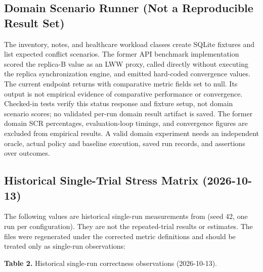 \documentclass[runningheads]{llncs}
\begin{document}
\subsection{Domain Scenario Runner (Not a Reproducible Result Set)}
The inventory, notes, and healthcare workload classes create SQLite fixtures and list expected conflict scenarios. The former API benchmark implementation scored the replica-B value as an LWW proxy, called \texttt{} directly without executing the replica synchronization engine, and emitted hard-coded convergence values. The current \texttt{} endpoint returns \texttt{} with comparative metric fields set to null. Its output is not empirical evidence of comparative performance or convergence. Checked-in tests verify this status response and fixture setup, not domain scenario scores; no validated per-run domain result artifact is saved. The former domain SCR percentages, evaluation-loop timings, and convergence figures are excluded from empirical results. A valid domain experiment needs an independent oracle, actual policy and baseline execution, saved run records, and assertions over outcomes.

\subsection{Historical Single-Trial Stress Matrix (2026-10-13)}
The following values are historical single-run measurements from \texttt{} (seed 42, one run per configuration). They are not the repeated-trial results or estimates. The files were regenerated under the corrected metric definitions and should be treated only as single-run observations:

\textbf{Table 2.} Historical single-run correctness observations (2026-10-13).
\end{document}
